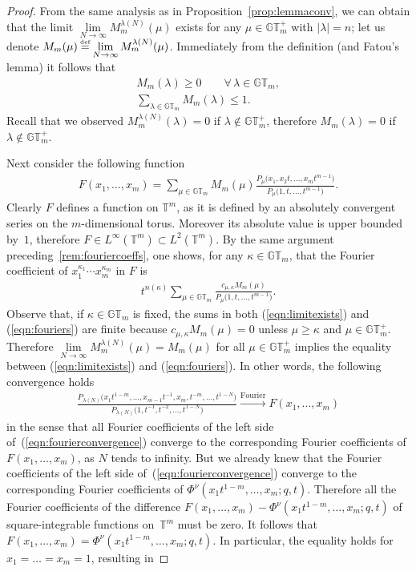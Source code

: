 \documentclass[pdftex]{sigma}
\numberwithin{equation}{section}
\newcommand\myeq{\mathrel{\stackrel{\makebox[0pt]{\mbox{\normalfont\tiny def}}}{=}}}
\newcommand{\GT}{\mathbb{GT}}
\newcommand{\GTp}{\mathbb{GT}^+}
\newcommand{\TT}{\mathbb{T}}
\begin{document}
\begin{proof}
From the same analysis as in Proposition~\ref{prop:lemmaconv}, we can obtain that the limit $\lim\limits_{N\rightarrow\infty}{M^{\lambda(N)}_m(\mu)}$ exists for any $\mu\in\GTp_m$ with $|\lambda| = n$; let us denote $M_m(\mu) \myeq \lim\limits_{N\rightarrow\infty}{M_m^{\lambda(N)}(\mu)}$.
Immediately from the def\/inition (and Fatou's lemma) it follows that
\begin{gather*}
M_m(\lambda) \geq 0 \qquad \forall\, \lambda\in\GT_m,\\
\sum_{\lambda\in\GT_m}{ M_m(\lambda) } \leq 1.
\end{gather*}
Recall that we observed $M^{\lambda(N)}_m(\lambda) = 0$ if $\lambda\notin\GTp_m$, therefore $M_m(\lambda) = 0$ if $\lambda\notin\GTp_m$.

Next consider the following function
\begin{gather*}
F(x_1, \dots, x_m) = \sum_{\mu\in\GT_m}{ M_m(\mu) \frac{P_{\mu}\big(x_1, x_2t, \dots, x_m t^{m-1}\big)}{P_{\mu}\big(1, t, \dots, t^{m-1}\big)} }.
\end{gather*}
Clearly $F$ def\/ines a function on $\TT^m$, as it is def\/ined by an absolutely convergent series on the $m$-dimensional torus. Moreover its absolute value is upper bounded by~$1$, therefore $F \in L^{\infty}(\TT^m) \subset L^2(\TT^m)$.
By the same argument preceding~\eqref{rem:fouriercoeffs}, one shows, for any $\kappa\in\GT_m$, that the Fourier coef\/f\/icient of $x_1^{\kappa_1}\cdots x_m^{\kappa_m}$ in $F$ is
\begin{gather}\label{eqn:fouriers}
t^{n(\kappa)}\sum_{\mu\in\GT_m}{ \frac{c_{\mu, \kappa}M_m(\mu)}{P_{\mu}\big(1, t, \dots, t^{m-1}\big)} }.
\end{gather}
Observe that, if $\kappa\in\GT_m$ is f\/ixed, the sums in both (\ref{eqn:limitexists}) and (\ref{eqn:fouriers}) are f\/inite because $c_{\mu, \kappa} M_m(\mu) = 0$ unless $\mu\geq\kappa$ and $\mu \in \GTp_m$. Therefore $\lim\limits_{N\rightarrow\infty}{M_m^{\lambda(N)}(\mu)} = M_m(\mu)$ for all $\mu\in\GTp_m$ implies the equality between (\ref{eqn:limitexists}) and (\ref{eqn:fouriers}). In other words, the following convergence holds
\begin{gather}\label{eqn:fourierconvergence}
\frac{P_{\lambda(N)}\big(x_1t^{1-m}, \dots, x_{m-1}t^{-1}, x_m, t^{-m}, \dots, t^{1 - N}\big)}{P_{\lambda(N)}\big(1, t^{-1}, t^{-2}, \dots, t^{1 - N}\big)} \xrightarrow{\textrm{Fourier}} F(x_1, \dots, x_m)
\end{gather}
in the sense that all Fourier coef\/f\/icients of the left side of~(\ref{eqn:fourierconvergence}) converge to the corresponding Fourier coef\/f\/icients of $F(x_1, \dots, x_m)$, as $N$ tends to inf\/inity. But we already knew that the Fourier coef\/f\/icients of the left side of~(\ref{eqn:fourierconvergence}) converge to the corresponding Fourier coef\/f\/icients of $\Phi^{\nu}(x_1t^{1-m}, \dots, x_m; q, t)$. Therefore all the Fourier coef\/f\/icients of the dif\/ference $F(x_1, \dots, x_m) - \Phi^{\nu}(x_1t^{1-m}, \dots, x_m; q, t)$ of square-integrable functions on~$\TT^m$ must be zero. It follows that $F(x_1, \dots, x_m) = \Phi^{\nu}(x_1t^{1-m}, \dots, x_m; q, t)$. In particular, the equality holds for $x_1 = \dots = x_m = 1$, resulting in

\end{proof}
\end{document}
